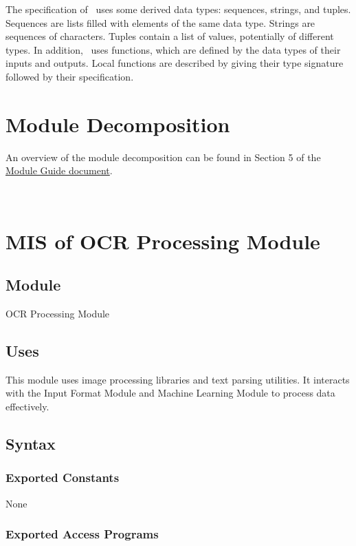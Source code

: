 \documentclass[12pt, titlepage]{article}
\begin{document}
\noindent
The specification of \progname \ uses some derived data types: sequences, strings, and
tuples. Sequences are lists filled with elements of the same data type. Strings
are sequences of characters. Tuples contain a list of values, potentially of
different types. In addition, \progname \ uses functions, which
are defined by the data types of their inputs and outputs. Local functions are
described by giving their type signature followed by their specification.

\section{Module Decomposition}

An overview of the module decomposition can be found in Section 5 of the
\href{https://github.com/smiths/capTemplate/blob/main/docs/Design/SoftArchitecture/MG.pdf}{Module
Guide document}.


~\newpage

\section{MIS of OCR Processing Module}\label{OCR_Processing_Module}

\subsection{Module}

OCR Processing Module

\subsection{Uses}

This module uses image processing libraries and text parsing utilities. It interacts with the Input Format Module and Machine Learning Module to process data effectively.

\subsection{Syntax}

\subsubsection{Exported Constants}

None

\subsubsection{Exported Access Programs}
\end{document}
